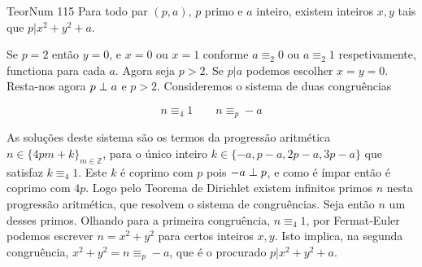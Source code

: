 \documentclass[repertorio-solutions-1.tex]{subfiles}
\begin{document}
\begin{problem}{TeorNum 115}
Para todo par $(p,a)$, $p$ primo e $a$ inteiro, existem inteiros $x,y$
tais que $p|x^2+y^2+a$.
\end{problem}

\begin{solution}
Se $p=2$ então $y=0$, e $x=0$ ou $x=1$ conforme $a\equiv_2 0$ ou $a\equiv_2 1$
respetivamente, functiona para cada $a$. Agora seja $p>2$.
Se $p|a$ podemos escolher $x=y=0$.
Resta-nos agora $p\perp a$ e $p>2$.
Consideremos o sistema de duas congruências

\begin{equation*}
n\equiv_4 1 \qquad n\equiv_p -a
\end{equation*}

As soluções deste sistema são os termos da progressão aritmética
$n\in\{4pm+k\}_{m\in\mathbb{Z}}$, para o único inteiro
$k\in\{-a,p-a,2p-a,3p-a\}$ que satisfaz $k\equiv_4 1$.
Este $k$ é coprimo com $p$ pois $-a\perp p$, e como é ímpar
então é coprimo com $4p$.
Logo pelo Teorema de Dirichlet existem infinitos primos $n$
nesta progressão aritmética, que resolvem o sistema de congruências.
Seja então $n$ um desses primos.
Olhando para a primeira congruência, $n\equiv_4 1$, por Fermat-Euler
podemos escrever $n=x^2+y^2$ para certos inteiros $x,y$.
Isto implica, na segunda congruência, $x^2+y^2=n\equiv_p -a$,
que é o procurado $p|x^2+y^2+a$.
\end{solution}
\end{document}
